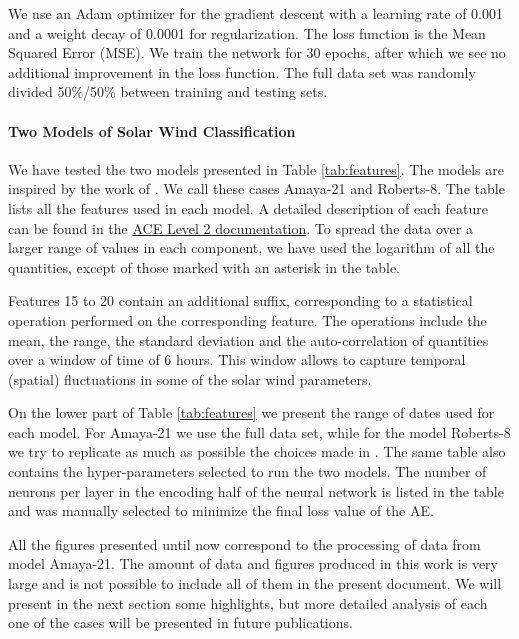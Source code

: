 We use an Adam optimizer \citep{Kingma2014} for the gradient descent with a learning rate of 0.001 and a weight decay of 0.0001 for regularization. The loss function is the Mean Squared Error (MSE). We train the network for 30 epochs, after which we see no additional improvement in the loss function. The full data set was randomly divided 50\%/50\% between training and testing sets.

\paragraph{Two Models of Solar Wind Classification}
\label{sec:fourmodels}
We have tested the two models presented in Table \ref{tab:features}. The models are inspired by the work of \citep{Roberts2020}. We call these cases Amaya-21 and Roberts-8.  The table lists all the features used in each model. A detailed description of each feature can be found in the \href{http://www.srl.caltech.edu/cgi-bin/dib/rundibviewmultil2/ACE/ASC/DATA/level2/multi}{ACE Level 2 documentation}. To spread the data over a larger range of values in each component, we have used the logarithm of all the quantities, except of those marked with an asterisk in the table.

Features 15 to 20 contain an additional suffix, corresponding to a statistical operation performed on the corresponding feature. The operations include the mean, the range, the standard deviation and the auto-correlation of quantities over a window of time of 6 hours. This window allows to capture temporal (spatial) fluctuations in some of the solar wind parameters.

On the lower part of Table \ref{tab:features} we present the range of dates used for each model. For Amaya-21 we use the full data set, while for the model Roberts-8 we try to replicate as much as possible the choices made in \citep{Roberts2020}. The same table also contains the hyper-parameters selected to run the two models. The number of neurons per layer in the encoding half of the neural network is listed in the table and was manually selected to minimize the final loss value of the AE.

All the figures presented until now correspond to the processing of data from model Amaya-21. The amount of data and figures produced in this work is very large and is not possible to include all of them in the present document. We will present in the next section some highlights, but more detailed analysis of each one of the cases will be presented in future publications.

